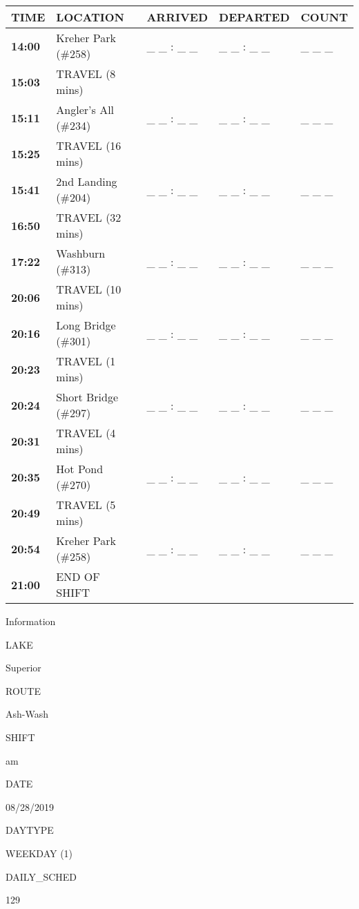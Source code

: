 \documentclass[]{article}
\begin{document}
\begin{tabular}{>{\bfseries}lllll}
\toprule
\textbf{TIME} & \textbf{LOCATION} & \textbf{ARRIVED} & \textbf{DEPARTED} & \textbf{COUNT}\\
\midrule
14:00 & Kreher Park (\#258) & \_ \_ : \_ \_ & \_ \_ : \_ \_ & \_ \_ \_\\
15:03 & TRAVEL (8 mins) &  &  & \\
15:11 & Angler's All (\#234) & \_ \_ : \_ \_ & \_ \_ : \_ \_ & \_ \_ \_\\
15:25 & TRAVEL (16 mins) &  &  & \\
15:41 & 2nd Landing (\#204) & \_ \_ : \_ \_ & \_ \_ : \_ \_ & \_ \_ \_\\
16:50 & TRAVEL (32 mins) &  &  & \\
17:22 & Washburn (\#313) & \_ \_ : \_ \_ & \_ \_ : \_ \_ & \_ \_ \_\\
20:06 & TRAVEL (10 mins) &  &  & \\
20:16 & Long Bridge (\#301) & \_ \_ : \_ \_ & \_ \_ : \_ \_ & \_ \_ \_\\
20:23 & TRAVEL (1 mins) &  &  & \\
20:24 & Short Bridge (\#297) & \_ \_ : \_ \_ & \_ \_ : \_ \_ & \_ \_ \_\\
20:31 & TRAVEL (4 mins) &  &  & \\
20:35 & Hot Pond (\#270) & \_ \_ : \_ \_ & \_ \_ : \_ \_ & \_ \_ \_\\
20:49 & TRAVEL (5 mins) &  &  & \\
20:54 & Kreher Park (\#258) & \_ \_ : \_ \_ & \_ \_ : \_ \_ & \_ \_ \_\\
21:00 & END OF SHIFT &  &  & \\
\bottomrule
\end{tabular}\newpage

Information

LAKE

Superior

ROUTE

Ash-Wash

SHIFT

am

DATE

08/28/2019

DAYTYPE

WEEKDAY (1)

DAILY\_SCHED

129

\vspace{24pt}
\end{document}
